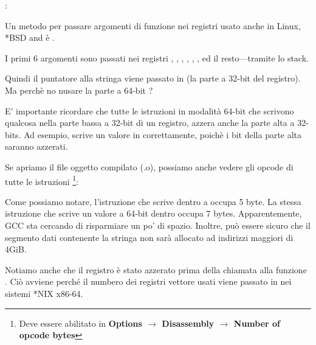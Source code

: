 
\ITAph{}:



Un metodo per passare argomenti di funzione nei registri usato anche in Linux, *BSD and \MacOSX è \SysVABI.

I primi 6 argomenti sono passati nei registri \RDI, \RSI, \RDX, \RCX, ,   , ed il resto---tramite lo stack.

Quindi il puntatore alla stringa viene passato in \EDI (la parte a 32-bit del registro).
Ma perchè no nusare la parte a 64-bit \RDI?

E' importante ricordare che tutte le istruzioni \MOV in modalità 64-bit che scrivono qualcosa nella parte bassa a 32-bit di un registro, azzera anche la parte alta a 32-bits.
Ad esempio,  scrive un valore in \RAX correttamente, poichè i bit della parte alta saranno azzerati.

Se apriamo il file oggetto compilato (.o), possiamo anche vedere gli opcode di tutte le istruzioni
\footnote{Deve essere abilitato in \textbf{Options $\rightarrow$ Disassembly $\rightarrow$ Number of opcode bytes}}:



\label{hw_EDI_instead_of_RDI}
Come possiamo notare, l'istruzione che scrive dentro \EDI a  occupa 5 byte.
La stessa istruzione che scrive un valore a 64-bit dentro \RDI occupa 7 bytes.
Apparentemente, GCC sta cercando di risparmiare un po' di spazio.
Inoltre, può essere sicuro che il segmento dati contenente la stringa non sarà allocato ad indirizzi maggiori di 4\gls{GiB}.

\label{SysVABI_input_EAX}
Notiamo anche che il registro \EAX è stato azzerato prima della chiamata alla funzione \printf .
Ciò avviene perché il numbero dei registri vettore usati viene passato in \EAX nei sistemi *NIX x86-64.

